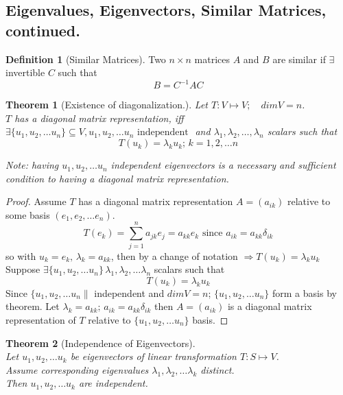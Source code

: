 \documentclass[twoside]{amsart}
\theoremstyle{plain}
\newtheorem{theorem}{Theorem}
\theoremstyle{definition}
\newtheorem{definition}{Definition}
\begin{document}
\subsection{ Eigenvalues, Eigenvectors, Similar Matrices, continued.}

\begin{definition}[Similar Matrices]
Two $n\times n$ matrices $A$ and $B$ are similar if $\exists$ invertible $C$ such that 
\begin{equation}
B= C^{-1} A C
\end{equation}
\end{definition}

\begin{theorem}[Existence of diagonalization.]\label{T:Diagonalization_existence}
Let $T:V \mapsto V; \quad dim V = n$. \\
$T$ has a diagonal matrix representation, 
\phantom{if} iff $\exists \{ u_1,u_2, \dots u_n \} \subseteq V, u_1,u_2,\dots u_n \text{ independent }$ and $\lambda_1, \lambda_2, \dots , \lambda_n $ scalars such that \\
\begin{equation*}
T(u_k) = \lambda_k u_k; \, k=1,2,\ldots n 
\end{equation*}

Note: having $u_1,u_2,\dots u_n$ independent eigenvectors is a necessary and sufficient condition to having a diagonal matrix representation.  
\end{theorem}

\begin{proof}
Assume $T$ has a diagonal matrix representation $A = (a_{ik})$ relative to some basis $(e_1,e_2,\dots e_n)$.  
\[
T(e_k) = \sum_{j=1}^n a_{jk} e_j = a_{kk}e_k \text{ since } a_{ik} = a_{kk} \delta_{ik}
\]
so with $u_k = e_k, \, \lambda_k = a_{kk}$, then by a change of notation $\Longrightarrow T(u_k) = \lambda_k u_k$ \\

Suppose $\exists \{u_1,u_2,\dots u_n \} \, \lambda_1, \lambda_2, \dots \lambda_n $ scalars such that 
\[
T(u_k) = \lambda_k u_k
\]
Since $\{ u_1,u_2,\dots u_n \| $ independent and $dim V= n$; $\{ u_1,u_2, \dots u_n \} $ form a basis by theorem.   
Let $\lambda_k = a_{kk}; \, a_{ik} = a_{kk} \delta_{ik} $
\phantom{Let} then $A = (a_{ik})$ is a diagonal matrix representation of $T$ relative to $\{ u_1,u_2,\dots u_n \}$ basis.  
\end{proof}

\begin{theorem}[Independence of Eigenvectors]\label{T:Eigenvectors_independence} \quad \\
Let $u_1,u_2,\dots u_k$ be eigenvectors of linear transformation $T:S \mapsto V$.  \\
Assume corresponding eigenvalues $\lambda_1,\lambda_2,\dots \lambda_k$ distinct.  \\
Then $u_1,u_2,\dots u_k$ are independent.
\end{theorem}
\end{document}
